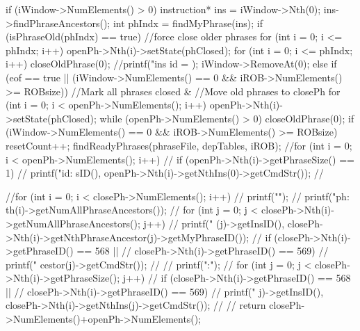 \begin{DoxyCode}
                                                                                 
                                                                           {
        if (iWindow->NumElements() > 0) {
                instruction* ins = iWindow->Nth(0);
                ins->findPhraseAncestors();
                int phIndx = findMyPhrase(ins);
                if (isPhraseOld(phIndx) == true) {
                        //force close older phrases
                        for (int i = 0; i <= phIndx; i++) {
                                openPh->Nth(i)->setState(phClosed);
                        }
                        for (int i = 0; i <= phIndx; i++) {
                                closeOldPhrase(0);
                        }
                }
                //printf("ins id = %
      );
                iWindow->RemoveAt(0);
        } else if (eof == true || 
                   (iWindow->NumElements() == 0 &&
                   iROB->NumElements() >= ROBsize)) {
                //Mark all phrases closed &
                //Move old phrases to closePh
                for (int i = 0; i < openPh->NumElements(); i++) {
                        openPh->Nth(i)->setState(phClosed);
                }
                while (openPh->NumElements() > 0) {
                        closeOldPhrase(0);
                }
                if (iWindow->NumElements() == 0 &&
                    iROB->NumElements() >= ROBsize) {
                        resetCount++;
                }
        }
        findReadyPhrases(phraseFile, depTables, iROB);
        //for (int i = 0; i < openPh->NumElements(); i++) {
        //      if (openPh->Nth(i)->getPhraseSize() == 1) 
        //              printf("id: %
      sID(), openPh->Nth(i)->getNthIns(0)->getCmdStr());
        //}

        //for (int i = 0; i < closePh->NumElements(); i++) {
        //      printf("\n");
        //      printf("ph: %
      th(i)->getNumAllPhraseAncestors());
        //      for (int j = 0; j < closePh->Nth(i)->getNumAllPhraseAncestors(); 
      j++) {
        //              printf("%
      (j)->getInsID(), closePh->Nth(i)->getNthPhraseAncestor(j)->getMyPhraseID());
        //              if (closePh->Nth(i)->getPhraseID() == 568 ||
        //                  closePh->Nth(i)->getPhraseID() == 569)
        //                      printf("%
      cestor(j)->getCmdStr());
        //      }
        //      printf("\nmembers:\n");
        //      for (int j = 0; j < closePh->Nth(i)->getPhraseSize(); j++) {
        //              if (closePh->Nth(i)->getPhraseID() == 568 ||
        //                  closePh->Nth(i)->getPhraseID() == 569)
        //                      printf("%
      j)->getInsID(), closePh->Nth(i)->getNthIns(j)->getCmdStr());
        //      }
        //}
        return closePh->NumElements()+openPh->NumElements();
}
\end{DoxyCode}
